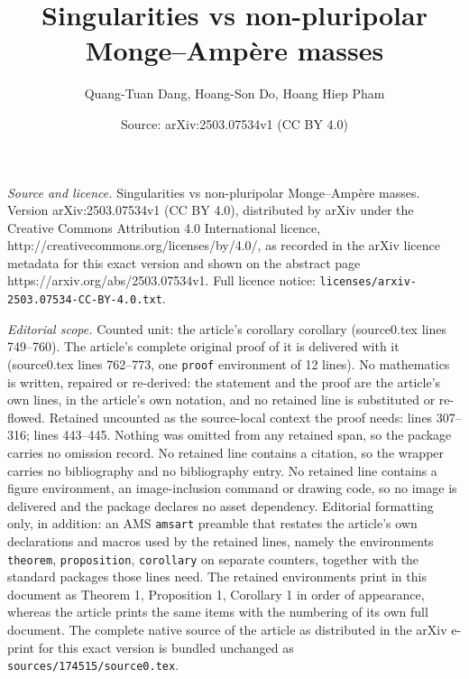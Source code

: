 \documentclass[10pt,a4paper]{amsart}
\title{Singularities vs non-pluripolar Monge--Amp\`{e}re masses}
\author{Quang-Tuan Dang, Hoang-Son Do, Hoang Hiep Pham}
\date{Source: arXiv:2503.07534v1 (CC BY 4.0)}
\begin{document}
\maketitle

\noindent\emph{Source and licence.} Singularities vs non-pluripolar Monge--Amp\`{e}re masses. Version arXiv:2503.07534v1 (CC BY 4.0), distributed by arXiv under the Creative Commons Attribution 4.0 International licence, http://creativecommons.org/licenses/by/4.0/, as recorded in the arXiv licence metadata for this exact version and shown on the abstract page https://arxiv.org/abs/2503.07534v1. Full licence notice: \texttt{licenses/arxiv-2503.07534-CC-BY-4.0.txt}.\par\smallskip

\noindent\textit{Editorial scope.} Counted unit: the article's corollary corollary (source0.tex lines 749--760). The article's complete original proof of it is delivered with it (source0.tex lines 762--773, one \texttt{proof} environment of 12 lines). No mathematics is written, repaired or re-derived: the statement and the proof are the article's own lines, in the article's own notation, and no retained line is substituted or re-flowed.  Retained uncounted as the source-local context the proof needs: lines 307--316; lines 443--445.  Nothing was omitted from any retained span, so the package carries no omission record.  No retained line contains a citation, so the wrapper carries no bibliography and no bibliography entry.  No retained line contains a figure environment, an image-inclusion command or drawing code, so no image is delivered and the package declares no asset dependency.  Editorial formatting only, in addition: an AMS \texttt{amsart} preamble that restates the article's own declarations and macros used by the retained lines, namely the environments \texttt{theorem}, \texttt{proposition}, \texttt{corollary} on separate counters, together with the standard packages those lines need.  The retained environments print in this document as Theorem 1, Proposition 1, Corollary 1 in order of appearance, whereas the article prints the same items with the numbering of its own full document.  The complete native source of the article as distributed in the arXiv e-print for this exact version is bundled unchanged as \texttt{sources/174515/source0.tex}.
\end{document}

